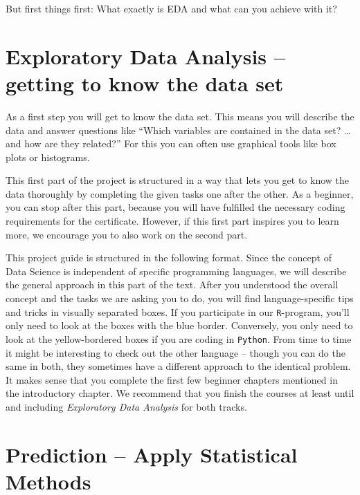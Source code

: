 \documentclass[
  11pt,
]{book}
\begin{document}
But first things first: What exactly is EDA and what can you achieve
with it?

\hypertarget{exploratory-data-analysis-getting-to-know-the-data-set}{%
\section{Exploratory Data Analysis -- getting to know the data
set}\label{exploratory-data-analysis-getting-to-know-the-data-set}}

As a first step you will get to know the data set. This means you will
describe the data and answer questions like ``Which variables are
contained in the data set? \ldots and how are they related?'' For this
you can often use graphical tools like box plots or histograms.

This first part of the project is structured in a way that lets you get
to know the data thoroughly by completing the given tasks one after the
other. As a beginner, you can stop after this part, because you will
have fulfilled the necessary coding requirements for the certificate.
However, if this first part inspires you to learn more, we encourage you
to also work on the second part.

This project guide is structured in the following format. Since the
concept of Data Science is independent of specific programming
languages, we will describe the general approach in this part of the
text. After you understood the overall concept and the tasks we are
asking you to do, you will find language-specific tips and tricks in
visually separated boxes. If you participate in our \texttt{R}-program,
you'll only need to look at the boxes with the blue border. Conversely,
you only need to look at the yellow-bordered boxes if you are coding in
\texttt{Python}. From time to time it might be interesting to check out
the other language -- though you can do the same in both, they sometimes
have a different approach to the identical problem. It makes sense that
you complete the first few beginner chapters mentioned in the
introductory chapter. We recommend that you finish the courses at least
until and including \emph{Exploratory Data Analysis} for both tracks.

\hypertarget{prediction-apply-statistical-methods}{%
\section{Prediction -- Apply Statistical
Methods}\label{prediction-apply-statistical-methods}}
\end{document}

